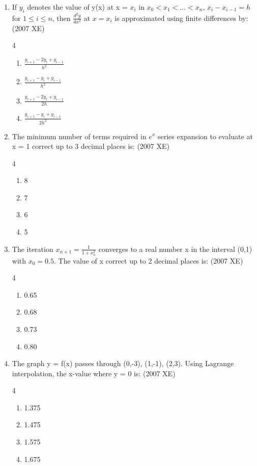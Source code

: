 \begin{enumerate}[label=\thesubsection.\arabic*,ref=\thesubsection.\theenumi]
    \item If $y_i$ denotes the value of y(x) at x = $x_i$ in  $x_0 < x_1 < \dots < x_n$, $x_i - x_{i-1} = h$ for $1 \le i \le n$, then  $\frac{d^2 y}{dx^2}$ at $x = x_i$ is approximated using finite differences by:\\
    \hfill{(2007 XE)}
    \begin{multicols}{4}
    \begin{enumerate}
        \item $\frac{y_{i+1} - 2y_i + y_{i-1}}{h^2}$
        \item $\frac{y_{i+1} - y_i + y_{i-1}}{h^2}$
        \item $\frac{y_{i+1} - 2y_i + y_{i-1}}{2h}$
        \item $\frac{y_{i+1} - y_i + y_{i-1}}{2h^2}$
    \end{enumerate}
\end{multicols}

    \item The minimum number of terms required in $e^x$ series expansion to evaluate at x = 1 correct up to 3 decimal places is:
    \hfill{(2007 XE)}
    \begin{multicols}{4}
    \begin{enumerate}
        \item 8
        \item 7
        \item 6
        \item 5
    \end{enumerate}
\end{multicols}

    \item The iteration $x_{n+1} = \frac{1}{1+x_n^2}$ converges to a real number x in the interval (0,1) with $x_0 = 0.5$. The value of x correct up to 2 decimal places is:
    \hfill{(2007 XE)}
    \begin{multicols}{4}
    \begin{enumerate}
        \item 0.65
        \item 0.68
        \item 0.73
        \item 0.80
    \end{enumerate}
    \end{multicols}


    \item The graph y = f(x) passes through (0,-3), (1,-1), (2,3). Using Lagrange interpolation, the x-value where y = 0 is:
    \hfill{(2007 XE)}
    \begin{multicols}{4}
    \begin{enumerate}
        \item 1.375
        \item 1.475
        \item 1.575
        \item 1.675
    \end{enumerate}
\end{multicols}


\end{enumerate}
